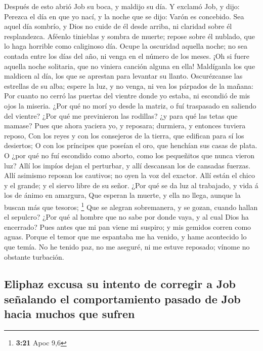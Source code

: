  Después de esto abrió Job su boca, y maldijo su día.
 Y exclamó Job, y dijo:  Perezca el día en
que yo nací, y la noche que se dijo: Varón es concebido. 
Sea aquel día sombrío, y Dios no cuide de él desde arriba, ni claridad
sobre él resplandezca.  Aféenlo tinieblas y sombra de
muerte; repose sobre él nublado, que lo haga horrible como caliginoso
día.  Ocupe la oscuridad aquella noche; no sea contada
entre los días del año, ni venga en el número de los meses.
 ¡Oh si fuere aquella noche solitaria, que no viniera
canción alguna en ella!  Maldíganla los que maldicen al
día, los que se aprestan para levantar su llanto. 
Oscurézcanse las estrellas de su alba; espere la luz, y no venga, ni vea
los párpados de la mañana:  Por cuanto no cerró las
puertas del vientre donde yo estaba, ni escondió de mis ojos la miseria.
 ¿Por qué no morí yo desde la matriz, o fuí traspasado en
saliendo del vientre?  ¿Por qué me previnieron las
rodillas? ¿y para qué las tetas que mamase?  Pues que
ahora yaciera yo, y reposara; durmiera, y entonces tuviera reposo,
 Con los reyes y con los consejeros de la tierra, que
edifican para sí los desiertos;  O con los príncipes que
poseían el oro, que henchían sus casas de plata.  O ¿por
qué no fuí escondido como aborto, como los pequeñitos que nunca vieron
luz?  Allí los impíos dejan el perturbar, y allí
descansan los de cansadas fuerzas.  Allí asimismo reposan
los cautivos; no oyen la voz del exactor.  Allí están el
chico y el grande; y el siervo libre de su señor.  ¿Por
qué se da luz al trabajado, y vida á los de ánimo en amargura,
 Que esperan la muerte, y ella no llega, aunque la buscan
más que tesoros; \footnote{\textbf{3:21} Apoc 9,6}  Que
se alegran sobremanera, y se gozan, cuando hallan el sepulcro?
 ¿Por qué al hombre que no sabe por donde vaya, y al cual
Dios ha encerrado?  Pues antes que mi pan viene mi
suspiro; y mis gemidos corren como aguas.  Porque el
temor que me espantaba me ha venido, y hame acontecido lo que temía.
 No he tenido paz, no me aseguré, ni me estuve reposado;
vínome no obstante turbación.

\hypertarget{eliphaz-excusa-su-intento-de-corregir-a-job-seuxf1alando-el-comportamiento-pasado-de-job-hacia-muchos-que-sufren}{%
\subsection{Eliphaz excusa su intento de corregir a Job señalando el
comportamiento pasado de Job hacia muchos que
sufren}\label{eliphaz-excusa-su-intento-de-corregir-a-job-seuxf1alando-el-comportamiento-pasado-de-job-hacia-muchos-que-sufren}}

